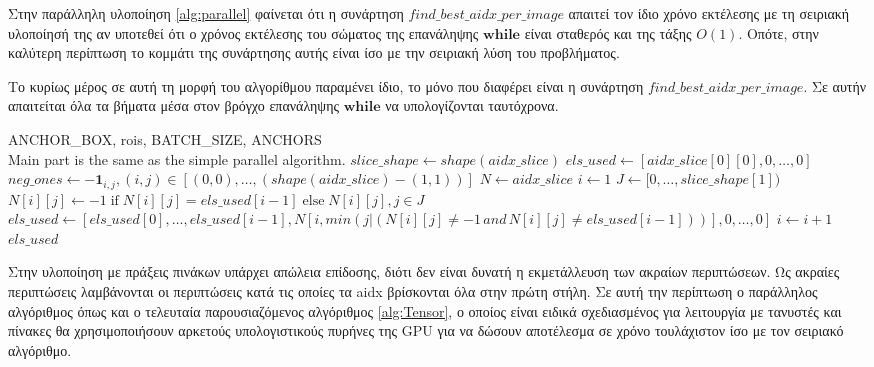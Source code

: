 Στην παράλληλη υλοποίηση \ref{alg:parallel} φαίνεται ότι η συνάρτηση $find\_best\_aidx\_per\_image$ απαιτεί τον ίδιο χρόνο εκτέλεσης με τη σειριακή υλοποίησή της αν υποτεθεί ότι ο χρόνος εκτέλεσης του σώματος της επανάληψης $\mathbf{while}$ είναι σταθερός και της τάξης $O(1)$. Οπότε, στην καλύτερη περίπτωση το κομμάτι της συνάρτησης αυτής είναι ίσο με την σειριακή λύση του προβλήματος.


\begin{algorithm}
\caption{Το κυρίως μέρος σε αυτή τη μορφή του αλγορίθμου παραμένει ίδιο, το μόνο που διαφέρει είναι η συνάρτηση $find\_best\_aidx\_per\_image$. Σε αυτήν απαιτείται όλα τα βήματα μέσα στον βρόγχο επανάληψης $\mathbf{while}$ να υπολογίζονται ταυτόχρονα.}
\label{alg:Tensor}
\begin{algorithmic}
\Require ANCHOR\_BOX, rois, BATCH\_SIZE, ANCHORS\\
Main part is the same as the simple parallel algorithm.
    \State $slice\_shape\gets shape(aidx\_slice)$
    \State $els\_used\gets [aidx\_slice[0][0], 0,\hdots,0]$
    \State $neg\_ones\gets -\mathbf{1}_{i,j}, (i,j) \in \left[(0,0),\hdots,(shape(aidx\_slice)-(1,1))\right]$
    \State $N\gets aidx\_slice$
    \State $i\gets 1$
    \State $J\gets [0,\hdots,slice\_shape[1])$
        \State $N[i][j]\gets -1 \; \text{if}\; N[i][j] = els\_used[i-1] \; \text{else}\; N[i][j], j \in J$
        \State $els\_used\gets [els\_used[0],\hdots,els\_used[i-1],N[i,min(j|(N[i][j]\neq-1\, and \, N[i][j]\neq els\_used[i-1]))],0,\hdots,0] $
        \State $i\gets i+1$
    \EndWhile\\
    \Return $els\_used$    
\EndFunction

\end{algorithmic}

\end{algorithm}
Στην υλοποίηση με πράξεις πινάκων υπάρχει απώλεια επίδοσης, διότι δεν είναι δυνατή η εκμετάλλευση των ακραίων περιπτώσεων. Ως ακραίες περιπτώσεις λαμβάνονται οι περιπτώσεις κατά τις οποίες τα aidx βρίσκονται όλα στην πρώτη στήλη. Σε αυτή την περίπτωση ο παράλληλος αλγόριθμος όπως και ο τελευταία παρουσιαζόμενος αλγόριθμος \ref{alg:Tensor}, ο οποίος είναι ειδικά σχεδιασμένος για λειτουργία με τανυστές και πίνακες θα χρησιμοποιήσουν αρκετούς υπολογιστικούς πυρήνες της GPU για να δώσουν αποτέλεσμα σε χρόνο τουλάχιστον ίσο με τον σειριακό αλγόριθμο.

